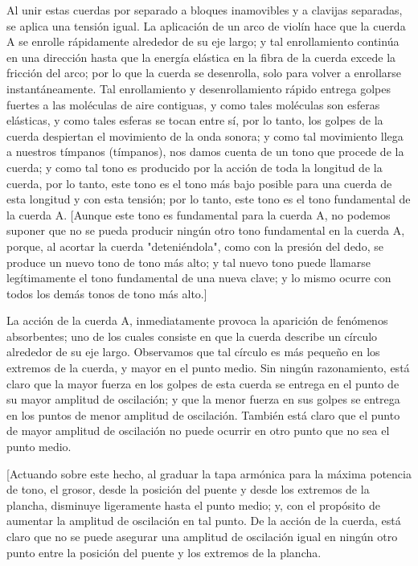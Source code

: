 \documentclass[12pt]{book}
\begin{document}
Al unir estas cuerdas por separado a bloques inamovibles y a clavijas separadas, se aplica una tensión igual. La aplicación de un arco de violín hace que la cuerda A se enrolle rápidamente alrededor de su eje largo; y tal enrollamiento continúa en una dirección hasta que la energía elástica en la fibra de la cuerda excede la fricción del arco; por lo que la cuerda se desenrolla, solo para volver a enrollarse instantáneamente. Tal enrollamiento y desenrollamiento rápido entrega golpes fuertes a las moléculas de aire contiguas, y como tales moléculas son esferas elásticas, y como tales esferas se tocan entre sí, por lo tanto, los golpes de la cuerda despiertan el movimiento de la onda sonora; y como tal movimiento llega a nuestros tímpanos (tímpanos), nos damos cuenta de un tono que procede de la cuerda; y como tal tono es producido por la acción de toda la longitud de la cuerda, por lo tanto, este tono es el tono más bajo posible para una cuerda de esta longitud y con esta tensión; por lo tanto, este tono es el tono fundamental de la cuerda A.
[Aunque este tono es fundamental para la cuerda A, no podemos suponer que no se pueda producir ningún otro tono fundamental en la cuerda A, porque, al acortar la cuerda "deteniéndola", como con la presión del dedo, se produce un nuevo tono de tono más alto; y tal nuevo tono puede llamarse legítimamente el tono fundamental de una nueva clave; y lo mismo ocurre con todos los demás tonos de tono más alto.]

La acción de la cuerda A, inmediatamente provoca la aparición de fenómenos absorbentes; uno de los cuales consiste en que la cuerda describe un círculo alrededor de su eje largo. Observamos que tal círculo es más pequeño en los extremos de la cuerda, y mayor en el punto medio. Sin ningún razonamiento, está claro que la mayor fuerza en los golpes de esta cuerda se entrega en el punto de su mayor amplitud de oscilación; y que la menor fuerza en sus golpes se entrega en los puntos de menor amplitud de oscilación. También está claro que el punto de mayor amplitud de oscilación no puede ocurrir en otro punto que no sea el punto medio.

[Actuando sobre este hecho, al graduar la tapa armónica para la máxima potencia de tono, el grosor, desde la posición del puente y desde los extremos de la plancha, disminuye ligeramente hasta el punto medio; y, con el propósito de aumentar la amplitud de oscilación en tal punto. De la acción de la cuerda, está claro que no se puede asegurar una amplitud de oscilación igual en ningún otro punto entre la posición del puente y los extremos de la plancha.
\end{document}
